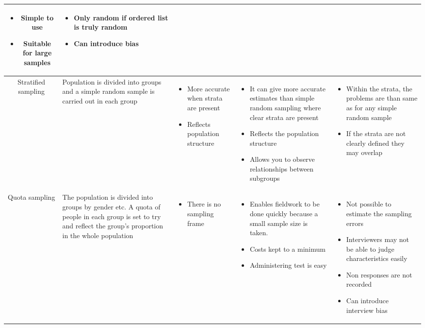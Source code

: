 \documentclass{article}[5pt]
\begin{document}
\begin{tabularx}{\textwidth}{|c|X|X|X|X|}
\begin{itemize}
\item Simple to use
\item Suitable for large samples
\end{itemize}&
\begin{itemize}
\item Only random if ordered list is truly random
\item Can introduce bias
\end{itemize}\\
\hline


Stratified sampling
&Population is divided into groups and a simple random sample is carried out in each group&

\begin{itemize}
\item More accurate when strata are present
\item Reflects population structure
\end{itemize}&

\begin{itemize}
\item It can give more accurate estimates than simple random sampling where clear strata are present
\item Reflects the population structure
\item Allows you to observe relationships between subgroups
\end{itemize}&
\begin{itemize}
\item Within the strata, the problems are than same as for any simple random sample
\item If the strata are not clearly defined they may overlap
\end{itemize}\\
\hline

Quota sampling
&The population is divided into groups by gender etc. A quota of people in each group is set to try and reflect the group's proportion in the whole population&
\begin{itemize}
\item There is no sampling frame
\end{itemize}&

\begin{itemize}
\item Enables fieldwork to be done quickly because a small sample size is taken.
\item Costs kept to a minimum
\item Administering test is easy
\end{itemize}&
\begin{itemize}
\item Not possible to estimate the sampling errors
\item Interviewers may not be able to judge characteristics easily
\item Non responses are not recorded
\item Can introduce interview bias
\end{itemize}\\
\hline
\end{tabularx}
\end{document}
